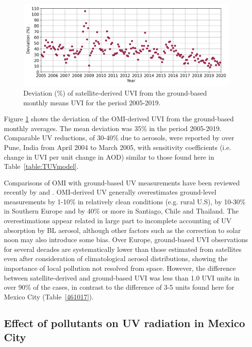 \documentclass[journal=jacsat,manuscript=article]{achemso}
\begin{document}
\begin{figure}[H]
  \centering
  \includegraphics[width=0.75\columnwidth]{figures/Monthly_mean_RD.png}
  \caption{Deviation (\%) of satellite-derived UVI from the ground-based monthly means UVI for the period 2005-2019.}
  \label{fig:percentage_relative_difference}
\end{figure}

Figure \ref{fig:percentage_relative_difference} shows the deviation of the OMI-derived UVI from the ground-based monthly averages. The mean deviation
was 35\% in the period 2005-2019. Comparable UV reductions, of 30-40\% due to aerosols, were reported by
\citet{Panicker_2009} over Pune, India from April 2004 to
March 2005, with sensitivity coefficients (i.e. change in UVI per unit
change in AOD) similar to those found here in Table~\ref{table:TUVmodel}.

Comparisons of OMI with ground-based UV measurements have been reviewed
recently by \citet{Zhang_2019} and \citet{Vitt_2020}.
OMI-derived UV generally overestimates
ground-level measurements by 1-10\% in relatively clean conditions (e.g.
rural U.S), by 10-30\% in Southern Europe and by 40\% or more in
Santiago, Chile\citep{Cabrera_2012} and Thailand\citep{Janjai_2013}. The
overestimations appear related in large part to incomplete accounting of
UV absorption by BL aerosol, although other factors such as the
correction to solar noon may also introduce some
bias.\citep{Zhang_2019} Over Europe, ground-based UVI observations for
several decades are systematically lower than those estimated from
satellites even after consideration of climatological aerosol
distributions, showing the importance of local pollution not resolved
from space.\citep{Vitt_2020} However, the difference between
satellite-derived and ground-based UVI was less than 1.0 UVI units in
over 90\% of the cases, in contrast to the difference of 3-5 units found
here for Mexico City (Table~{\ref{461017}}).

\subsection{Effect of pollutants on UV radiation in Mexico City}
\end{document}
